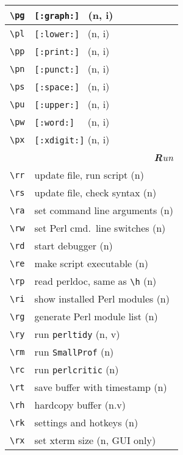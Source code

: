 \documentclass[oneside,11pt,a4paper,DIV23]{scrartcl}
\begin{document}
\begin{center}
\begin{tabular}[]{|p{10mm}|p{60mm}|}
\hline \verb'\pg' &  \verb'[:graph:] '         \hfill (n, i)\\
\hline \verb'\pl' &  \verb'[:lower:] '         \hfill (n, i)\\
\hline \verb'\pp' &  \verb'[:print:] '         \hfill (n, i)\\
\hline \verb'\pn' &  \verb'[:punct:] '         \hfill (n, i)\\
\hline \verb'\ps' &  \verb'[:space:] '         \hfill (n, i)\\
\hline \verb'\pu' &  \verb'[:upper:] '         \hfill (n, i)\\
\hline \verb'\pw' &  \verb'[:word:]  '         \hfill (n, i)\\
\hline \verb'\px' &  \verb'[:xdigit:]'         \hfill (n, i)\\
\hline
\hline
\multicolumn{2}{|r|}{\textsl{\textbf{R}un}} \\
\hline \verb'\rr' & update file, run script         \hfill (n)\\
\hline \verb'\rs' & update file, check syntax       \hfill (n)\\
\hline \verb'\ra' & set command line arguments      \hfill (n)\\
\hline \verb'\rw' & set Perl cmd.\ line switches    \hfill (n)\\
\hline \verb'\rd' & start debugger                  \hfill (n)\\
\hline \verb'\re' & make script executable          \hfill (n)\\
\hline \verb'\rp' & read perldoc, same as \verb'\h' \hfill (n)\\
\hline \verb'\ri' & show installed Perl modules     \hfill (n)\\
\hline \verb'\rg' & generate Perl module list       \hfill (n)\\
\hline \verb'\ry' & run \texttt{perltidy}           \hfill (n, v)\\
\hline \verb'\rm' & run \texttt{SmallProf}          \hfill (n)\\
\hline \verb'\rc' & run \texttt{perlcritic}         \hfill (n)\\
\hline \verb'\rt' & save buffer with timestamp      \hfill (n)\\
\hline \verb'\rh' & hardcopy buffer                 \hfill (n.v)\\
\hline \verb'\rk' & settings and hotkeys            \hfill (n)\\
\hline \verb'\rx' & set xterm size                  \hfill (n, {\tiny GUI only})\\

\end{tabular}
\end{center}
\end{document}
